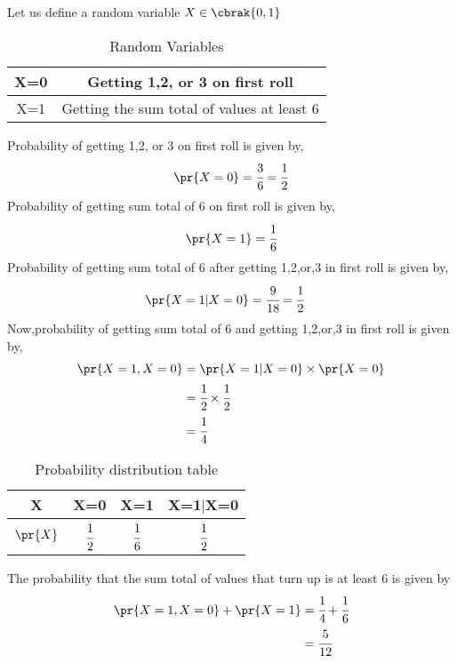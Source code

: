 
Let us define a random variable $X \in \cbrak{0,1}$\\
\begin{table}[ht]
    \centering
    \begin{tabular}{|c|c|}
    \hline
    X=0 & Getting 1,2, or 3 on first roll\\
    \hline
    X=1 & Getting the sum total of values at least 6\\
    \hline
    \end{tabular}
    \caption{Random Variables}
    \label{cs2012-33:tab:Random Variables}
\end{table}

Probability of getting 1,2, or 3 on first roll is given by,
\begin{align}
    \pr{X=0}&=\cfrac{3}{6}= \cfrac{1}{2}\\
\end{align}
Probability of getting sum total of 6 on first roll is given by,
\begin{align}   
    \pr{X=1}&= \cfrac{1}{6}\\
\end{align} 
Probability of getting sum total of 6 after getting 1,2,or,3 in first roll is given by,
\begin{align}    
    \pr{X=1|X=0}&=\cfrac{9}{18}= \cfrac{1}{2}
\end{align}
Now,probability of getting sum total of 6 and getting 1,2,or,3 in first roll is given by,
\begin{align}
    \pr{X=1 , X=0}&=\pr{X=1|X=0}\times\pr{X=0}\\
                     &=\cfrac{1}{2} \times \cfrac{1}{2}\\
                     &=\cfrac{1}{4}
\end{align}
\begin{table}[ht]
    \centering
    \begin{tabular}{|c|c|c|c|}
    \hline
    X & X=0 & X=1 & X=1$|$X=0\\
    \hline
    $\pr{X}$ & $\cfrac{1}{2}$ & $\cfrac{1}{6}$ & $\cfrac{1}{2}$\\
    \hline
    \end{tabular}
    \caption{Probability distribution table}
    \label{cs2012-33:tab:Probability distribution table}
\end{table}
\newline
The probability that the sum total of values that turn up is at least 6 is given by
\begin{align}
    \pr{X=1 , X=0} + \pr{X=1} &= \cfrac{1}{4} + \cfrac{1}{6}\\
    &=\cfrac{5}{12}
\end{align}